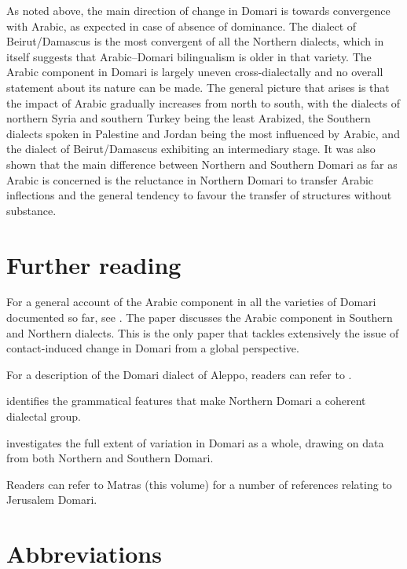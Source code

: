 \documentclass[output=paper]{langsci/langscibook}
\begin{document}
As noted above, the main direction of change in Domari is towards convergence with Arabic, as expected in case of absence of dominance. The dialect of Beirut/Damascus is the most convergent of all the Northern dialects, which in itself suggests that Arabic--Domari bilingualism is older in that variety. The Arabic component in Domari is largely uneven cross-dialectally and no overall statement about its nature can be made. The general picture that arises is that the impact of Arabic gradually increases from north to south, with the dialects of northern Syria and southern Turkey being the least Arabized, the Southern dialects spoken in Palestine and Jordan being the most influenced by Arabic, and the dialect of Beirut/Damascus exhibiting an intermediary stage. It was also shown that the main difference between Northern and Southern Domari as far as Arabic is concerned is the reluctance in Northern Domari to transfer Arabic inflections and the general tendency to favour the transfer of structures without substance.

\section*{Further reading}

For a general account of the Arabic component in all the varieties of Domari documented so far, see \citet{Herin2018}. The paper discusses the Arabic component in Southern and Northern dialects. This is the only paper that tackles extensively the issue of contact-induced change in Domari from a global perspective.

For a description of the Domari dialect of Aleppo, readers can refer to \citet{Herin2012}.

\citet{Herin2014Domari} identifies the grammatical features that make Northern Domari a coherent dialectal group.

\citet{Herin2016} investigates the full extent of variation in Domari as a whole, drawing on data from both Northern and Southern Domari.

Readers can refer to Matras (this volume) for a number of references relating to Jerusalem Domari.

\section*{Abbreviations}
\end{document}
